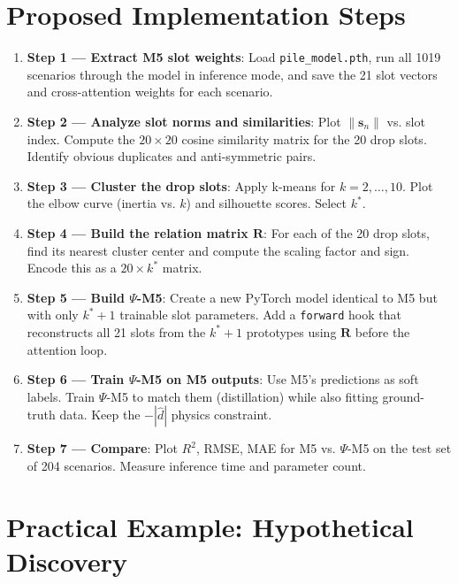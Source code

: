 \documentclass[11pt,a4paper]{article}
\begin{document}
\section{Proposed Implementation Steps}

\begin{enumerate}[leftmargin=*]
    \item \textbf{Step 1 --- Extract M5 slot weights}: Load \texttt{pile\_model.pth}, run all 1019 scenarios through the model in inference mode, and save the 21 slot vectors and cross-attention weights for each scenario.
    
    \item \textbf{Step 2 --- Analyze slot norms and similarities}: Plot $\|\mathbf{s}_n\|$ vs. slot index. Compute the $20 \times 20$ cosine similarity matrix for the 20 drop slots. Identify obvious duplicates and anti-symmetric pairs.
    
    \item \textbf{Step 3 --- Cluster the drop slots}: Apply k-means for $k = 2, \ldots, 10$. Plot the elbow curve (inertia vs. $k$) and silhouette scores. Select $k^*$.
    
    \item \textbf{Step 4 --- Build the relation matrix $\mathbf{R}$}: For each of the 20 drop slots, find its nearest cluster center and compute the scaling factor and sign. Encode this as a $20 \times k^*$ matrix.
    
    \item \textbf{Step 5 --- Build $\Psi$-M5}: Create a new PyTorch model identical to M5 but with only $k^* + 1$ trainable slot parameters. Add a \texttt{forward} hook that reconstructs all 21 slots from the $k^* + 1$ prototypes using $\mathbf{R}$ before the attention loop.
    
    \item \textbf{Step 6 --- Train $\Psi$-M5 on M5 outputs}: Use M5's predictions as soft labels. Train $\Psi$-M5 to match them (distillation) while also fitting ground-truth data. Keep the $-|\hat{d}|$ physics constraint.
    
    \item \textbf{Step 7 --- Compare}: Plot $R^2$, RMSE, MAE for M5 vs. $\Psi$-M5 on the test set of 204 scenarios. Measure inference time and parameter count.
\end{enumerate}

\section{Practical Example: Hypothetical Discovery}
\end{document}
